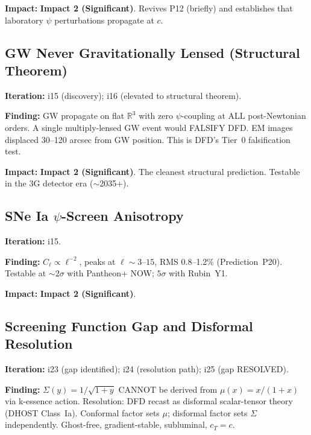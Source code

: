 \documentclass[11pt,a4paper]{article}
\newcommand{\imptwo}{\textcolor{impact2}{\textbf{Impact 2 (Significant)}}}
\begin{document}
\textbf{Impact:} \imptwo. Revives P12 (briefly) and establishes that
laboratory $\psi$ perturbations propagate at $c$.

\subsection{GW Never Gravitationally Lensed (Structural Theorem)}

\textbf{Iteration:} i15 (discovery); i16 (elevated to structural theorem).

\textbf{Finding:} GW propagate on flat $\mathbb{R}^3$ with zero
$\psi$-coupling at ALL post-Newtonian orders. A single multiply-lensed
GW event would FALSIFY DFD. EM images displaced 30--120 arcsec from GW
position. This is DFD's Tier~0 falsification test.

\textbf{Impact:} \imptwo. The cleanest structural prediction. Testable
in the 3G detector era ($\sim$2035+).

\subsection{SNe Ia $\psi$-Screen Anisotropy}

\textbf{Iteration:} i15.

\textbf{Finding:} $C_\ell \propto \ell^{-2}$, peaks at $\ell \sim 3$--$15$,
RMS 0.8--1.2\% (Prediction~P20). Testable at $\sim 2\sigma$ with
Pantheon+ NOW; $5\sigma$ with Rubin~Y1.

\textbf{Impact:} \imptwo.

\subsection{Screening Function Gap and Disformal Resolution}

\textbf{Iteration:} i23 (gap identified); i24 (resolution path); i25
(gap RESOLVED).

\textbf{Finding:} $\Sigma(y) = 1/\sqrt{1+y}$ CANNOT be derived from
$\mu(x) = x/(1+x)$ via k-essence action. Resolution: DFD recast as
disformal scalar-tensor theory (DHOST Class~Ia). Conformal factor sets
$\mu$; disformal factor sets $\Sigma$ independently. Ghost-free,
gradient-stable, subluminal, $c_T = c$.
\end{document}

